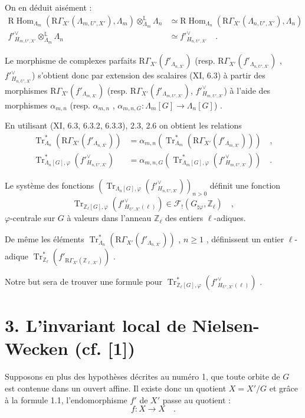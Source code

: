 \documentclass[11pt]{article}
\DeclareMathOperator{\Hom}{Hom}
\newcommand{\R}{\mathrm{R}}\newcommand{\RHomCore}{\mathrm{RHom}}
\providecommand{\Tr}{\operatorname{Tr}}
\providecommand{\Tr}{\operatorname{Tr}}
\providecommand{\Tr}{\operatorname{Tr}}
\providecommand{\Hom}{\operatorname{Hom}}
\providecommand{\R}{\mathrm R}
\providecommand{\Tr}{\operatorname{Tr}}
\providecommand{\La}{\Lambda}
\providecommand{\bZ}{\mathbb Z}
\providecommand{\Hom}{\operatorname{Hom}}
\providecommand{\Tr}{\operatorname{Tr}}
\begin{document}
On en déduit aisément :
\begin{align}
\tag{2.5} \R\Hom_{\La_m}(\R\Gamma_{X'}(\La_{m,U',X'}), \La_m) \otimes_{\La_m}^{\mathbb{L}} \La_n &\simeq \R\Hom_{\La_n}(\R\Gamma_{X'}(\La_{n,U',X'}), \La_n) \\
\tag{2.6} f'^\vee_{H_{m,U',X'}} \otimes_{\La_m}^{\mathbb{L}} \La_n &\simeq f'^\vee_{H_{n,U',X'}} \quad .
\end{align}

Le morphisme de complexes parfaits $\R\Gamma_{X'}(f'_{\La_{n,X'}})$ (resp. $\R\Gamma_{X'}(f'_{\La_{n,U',X'}})$ , $f'^\vee_{H_{n,U',X'}}$) s'obtient donc par extension des scalaires (XI, 6.3) à partir des morphismes $\R\Gamma_{X'}(f'_{\La_{m,X'}})$ (resp. $\R\Gamma_{X'}(f'_{\La_{m,U',X'}})$, $f'^\vee_{H_{m,U',X'}}$) à l'aide des morphismes $\alpha_{m,n}$ (resp. $\alpha_{m,n}$ , $\alpha_{m,n,G} : \La_m[G] \longrightarrow \La_n[G]$) .

En utilisant (XI, 6.3, 6.3.2, 6.3.3), 2.3, 2.6 on obtient les relations
\begin{align}
\tag{2.7} \Tr^*_{\La_n}(\R\Gamma_{X'}(f'_{\La_{n,X'}})) &= \alpha_{m,n}(\Tr^*_{\La_m}(\R\Gamma_{X'}(f'_{\La_{m,X'}}))) \quad , \\
\tag{2.8} \Tr^*_{\La_n[G],\varphi}(f'^\vee_{H_{n,U',X'}}) &= \alpha_{m,n,G}(\Tr^*_{\La_m[G],\varphi}(f'^\vee_{H_{m,U',X'}})) \quad .
\end{align}

Le système des fonctions $(\Tr_{\La_n[G],\varphi}(f'^\vee_{H_{n,U',X'}}))_{n>0}$ définit une fonction
\[
\Tr_{\bZ_\ell[G],\varphi}(f'^\vee_{H_{U',X'}(\ell)}) \in \mathcal{F}_!(G_{\natural\varphi}, \bZ_\ell) \quad ,
\]
$\varphi$-centrale sur $G$ à valeurs dans l'anneau $\bZ_\ell$ des entiers $\ell$-adiques.

De même les éléments $\Tr^*_{\La_n}(\R\Gamma_{X'}(f'_{\La_{n,X'}}))$ , $n \geq 1$ , définissent un entier $\ell$-adique $\Tr^*_{\bZ_\ell}(f'_{\R\Gamma_{X'}(\bZ_{\ell,X'})})$ .

Notre but sera de trouver une formule pour $\Tr^*_{\bZ_\ell[G],\varphi}(f'^\vee_{H_{U',X'}(\ell)})$ .


\section*{3. L'invariant local de Nielsen-Wecken (cf. [1])}
Supposons en plus des hypothèses décrites au numéro 1, que toute orbite de $G$ est contenue dans un ouvert affine. Il existe donc un quotient $X = X'/G$ et grâce à la formule 1.1, l'endomorphisme $f'$ de $X'$ passe au quotient :
\[
f : X \longrightarrow X \quad .
\]
\end{document}
